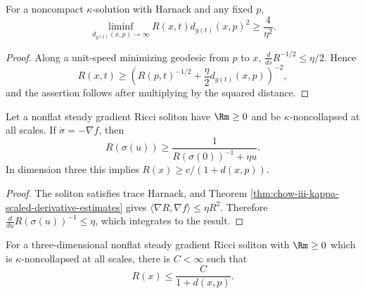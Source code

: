 \begin{corollary}
\label{cor:chow-iii-kappa-quadratic-curvature-lower-bound}
For a noncompact $\kappa$-solution with Harnack and any fixed $p$,
\[
 \liminf_{d_{g(t)}(x,p)\to\infty}R(x,t)d_{g(t)}(x,p)^2
 \ge\frac4{\eta^2}.
\]
\end{corollary}
\begin{proof}
\sketch Along a unit-speed minimizing geodesic from $p$ to $x$,
$\frac d{ds}R^{-1/2}\le\eta/2$.  Hence
\[
 R(x,t)\ge
 \left(R(p,t)^{-1/2}+\frac\eta2d_{g(t)}(x,p)\right)^{-2},
\]
and the assertion follows after multiplying by the squared distance.
\end{proof}

\begin{corollary}
\label{cor:chow-iii-steady-soliton-flowline-curvature-lower-bound}
Let a nonflat steady gradient Ricci soliton have $\Rm\ge0$ and be
$\kappa$-noncollapsed at all scales.  If
$\dot\sigma=-\nabla f$, then
\[
 R(\sigma(u))\ge
 \frac1{R(\sigma(0))^{-1}+\eta u}.
\]
In dimension three this implies $R(x)\ge c/(1+d(x,p))$.
\end{corollary}
\begin{proof}
\sketch The soliton satisfies trace Harnack, and Theorem
\ref{thm:chow-iii-kappa-scaled-derivative-estimates} gives
$\langle\nabla R,\nabla f\rangle\le\eta R^2$.  Therefore
$\frac d{du}R(\sigma(u))^{-1}\le\eta$, which integrates to the result.
\end{proof}

\begin{corollary}
\label{cor:chow-iii-3d-steady-soliton-curvature-upper-bound}
For a three-dimensional nonflat steady gradient Ricci soliton with
$\Rm\ge0$ which is $\kappa$-noncollapsed at all scales, there is $C<\infty$
such that
\[
 R(x)\le\frac C{1+d(x,p)}.
\]
\end{corollary}
